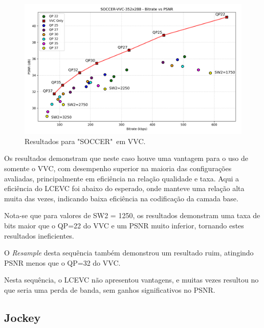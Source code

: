 \begin{figure}[h]
    \centering
    \includegraphics[width=1.0\textwidth]{img/SOCCER-VVC.png}
    \caption{Resultados para "SOCCER"\ em \acrshort{VVC}. \cite{xiph}}
    \label{fig:Soccer-VVC}
\end{figure}

Os resultados demonstram que neste caso houve uma vantagem para o uso de
somente o \acrshort{VVC}, com desempenho superior na maioria das configurações
avaliadas, principalmente em eficiência na relação qualidade e taxa.
Aqui a eficiência do \acrshort{LCEVC} foi abaixo do esperado, onde manteve
uma relação alta muita das vezes, indicando baixa eficiência na codificação
da camada base.

Nota-se que para valores de SW2 = 1250, os resultados demonstram uma taxa de bits
maior que o QP=22 do \acrshort{VVC} e um \acrshort{PSNR} muito inferior, tornando
estes resultados ineficientes.

O \textit{Resample} desta sequência também demonstrou um resultado ruim, atingindo
\acrshort{PSNR} menos que o QP=32 do \acrshort{VVC}.

Nesta sequência, o \acrshort{LCEVC} não apresentou vantagens, e muitas vezes
resultou no que seria uma perda de banda, sem ganhos significativos no
\acrshort{PSNR}.

\newpage
\subsection{Jockey}

